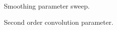 \begin{figure}[H]
  \hfill
  \caption{Smoothing parameter sweep.}
  \label{fig:hessian_var}
\end{figure}

\begin{figure}[H]
  \centering
  \hfill
  \caption{Second order convolution parameter.}
  \label{fig:hessian_img}
\end{figure}

